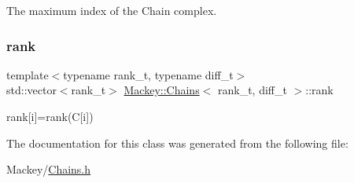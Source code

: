 The maximum index of the Chain complex. 

\mbox{\label{classMackey_1_1Chains_ad041dff6f210ae5be4de0a3b076a4d95}} 
\subsubsection{\texorpdfstring{rank}{rank}}
{\footnotesize\ttfamily template$<$typename rank\+\_\+t, typename diff\+\_\+t$>$ \\
std\+::vector$<$rank\+\_\+t$>$ \hyperlink{classMackey_1_1Chains}{Mackey\+::\+Chains}$<$ rank\+\_\+t, diff\+\_\+t $>$\+::rank}



rank\mbox{[}i\mbox{]}=rank(\+C\mbox{[}i\mbox{]}) 



The documentation for this class was generated from the following file\+:\begin{DoxyCompactItemize}
\item 
Mackey/\hyperlink{Chains_8h}{Chains.\+h}\end{DoxyCompactItemize}
